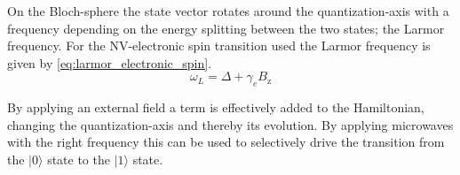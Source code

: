 On the Bloch-sphere the state vector rotates around the quantization-axis with a frequency depending on the energy splitting between the two states; the Larmor frequency.
For the NV-electronic spin transition used the Larmor frequency is given by \cref{eq:larmor_electronic_spin}.
\begin{equation}
    \omega_L =\Delta + \gamma_e {B_\mathrm{z}}
    \label{eq:larmor_electronic_spin}
\end{equation}

By applying an external field a term is effectively added to the Hamiltonian, changing the quantization-axis and thereby its evolution. By applying microwaves with the right frequency this can be used to selectively drive the transition from the  $|0\rangle$ state to the $|1\rangle$ state\citep{Jelezko2004Observation}.


